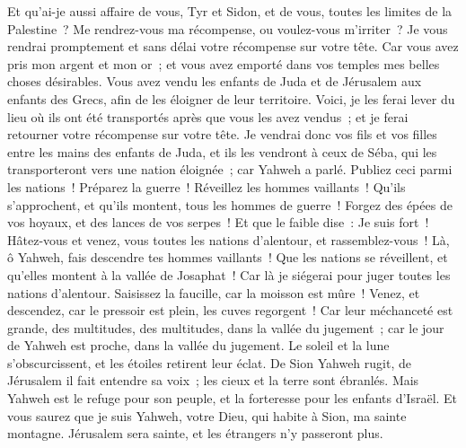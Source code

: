 \begin{multicols}{2}
Et qu'ai-je aussi affaire de vous, Tyr et Sidon, et de vous, toutes les limites de la Palestine~? Me rendrez-vous ma récompense, ou voulez-vous m'irriter~? Je vous rendrai promptement et sans délai votre récompense sur votre tête.
Car vous avez pris mon argent et mon or~; et vous avez emporté dans vos temples mes belles choses désirables.
Vous avez vendu les enfants de Juda et de Jérusalem aux enfants des Grecs, afin de les éloigner de leur territoire.
Voici, je les ferai lever du lieu où ils ont été transportés après que vous les avez vendus~; et je ferai retourner votre récompense sur votre tête.
Je vendrai donc vos fils et vos filles entre les mains des enfants de Juda, et ils les vendront à ceux de Séba, qui les transporteront vers une nation éloignée~; car Yahweh a parlé.
Publiez ceci parmi les nations~! Préparez la guerre~! Réveillez les hommes vaillants~! Qu'ils s'approchent, et qu'ils montent, tous les hommes de guerre~!
Forgez des épées de vos hoyaux, et des lances de vos serpes~! Et que le faible dise~: Je suis fort~!
Hâtez-vous et venez, vous toutes les nations d'alentour, et rassemblez-vous~! Là, ô Yahweh, fais descendre tes hommes vaillants~!
Que les nations se réveillent, et qu'elles montent à la vallée de Josaphat~! Car là je siégerai pour juger toutes les nations d'alentour.
Saisissez la faucille, car la moisson est mûre~! Venez, et descendez, car le pressoir est plein, les cuves regorgent~! Car leur méchanceté est grande,
des multitudes, des multitudes, dans la vallée du jugement~; car le jour de Yahweh est proche, dans la vallée du jugement.
Le soleil et la lune s'obscurcissent, et les étoiles retirent leur éclat.
De Sion Yahweh rugit, de Jérusalem il fait entendre sa voix~; les cieux et la terre sont ébranlés. Mais Yahweh est le refuge pour son peuple, et la forteresse pour les enfants d'Israël.
Et vous saurez que je suis Yahweh, votre Dieu, qui habite à Sion, ma sainte montagne. Jérusalem sera sainte, et les étrangers n'y passeront plus.

\end{multicols}
